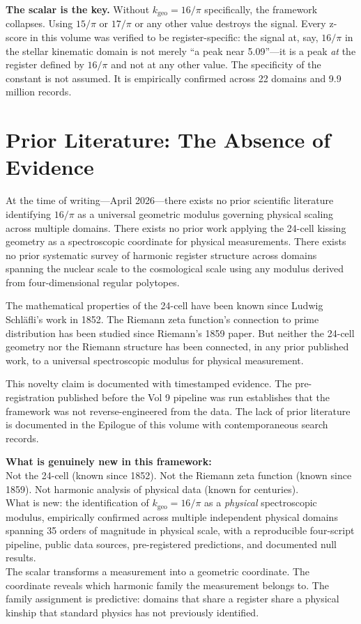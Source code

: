\documentclass[11pt, letterpaper, openany]{book}
\begin{document}
\begin{warningbox}
\textbf{The scalar is the key.} Without $k_\text{geo} = 16/\pi$ specifically, the
framework collapses. Using $15/\pi$ or $17/\pi$ or any other value destroys the
signal. Every z-score in this volume was verified to be register-specific: the
signal at, say, $16/\pi$ in the stellar kinematic domain is not merely ``a peak
near 5.09''---it is a peak \emph{at} the register defined by $16/\pi$ and not
at any other value. The specificity of the constant is not assumed. It is
empirically confirmed across 22 domains and 9.9 million records.
\end{warningbox}

\section{Prior Literature: The Absence of Evidence}

At the time of writing---April 2026---there exists no prior scientific literature
identifying $16/\pi$ as a universal geometric modulus governing physical scaling
across multiple domains. There exists no prior work applying the 24-cell kissing
geometry as a spectroscopic coordinate for physical measurements. There exists no
prior systematic survey of harmonic register structure across domains spanning the
nuclear scale to the cosmological scale using any modulus derived from four-dimensional
regular polytopes.

The mathematical properties of the 24-cell have been known since Ludwig Schläfli's
work in 1852. The Riemann zeta function's connection to prime distribution has been
studied since Riemann's 1859 paper. But neither the 24-cell geometry nor the Riemann
structure has been connected, in any prior published work, to a universal spectroscopic
modulus for physical measurement.

This novelty claim is documented with timestamped evidence. The pre-registration
published before the Vol 9 pipeline was run establishes that the framework was not
reverse-engineered from the data. The lack of prior literature is documented
in the Epilogue of this volume with contemporaneous search records.

\begin{discoverybox}
\textbf{What is genuinely new in this framework:}\\[0.5em]
Not the 24-cell (known since 1852). Not the Riemann zeta function (known since
1859). Not harmonic analysis of physical data (known for centuries).\\[0.5em]
What is new: the identification of $k_\text{geo} = 16/\pi$ as a \emph{physical}
spectroscopic modulus, empirically confirmed across multiple independent physical
domains spanning 35 orders of magnitude in physical scale, with a reproducible
four-script pipeline, public data sources, pre-registered predictions, and
documented null results.\\[0.5em]
The scalar transforms a measurement into a geometric coordinate. The coordinate
reveals which harmonic family the measurement belongs to. The family assignment
is predictive: domains that share a register share a physical kinship that
standard physics has not previously identified.
\end{discoverybox}
\end{document}
